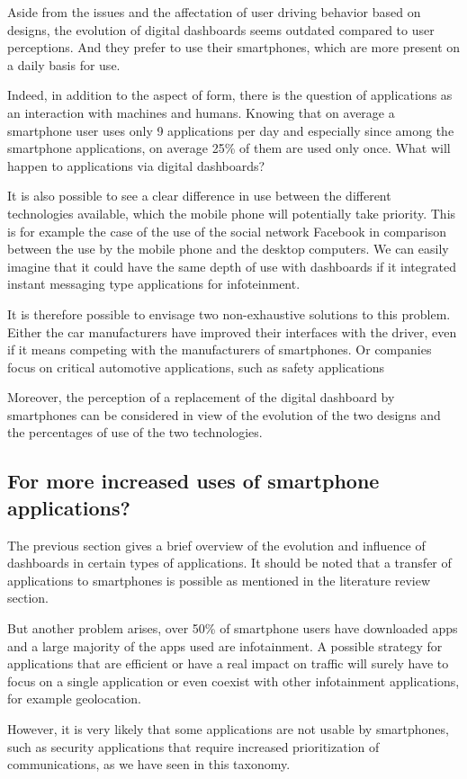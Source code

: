 Aside from the issues and the affectation of user driving behavior based on designs\cite{firby_its_2020}, the evolution of digital dashboards seems outdated compared to user perceptions. And they prefer to use their smartphones, which are more present on a daily basis for use.

Indeed, in addition to the aspect of form, there is the question of applications as an interaction with machines and humans. Knowing that on average a smartphone user uses only 9 applications per day\cite{web_55_2019} and especially since among the smartphone applications, on average 25\% of them are used only once\cite{noauthor__nodate}. What will happen to applications via digital dashboards?

It is also possible to see a clear difference in use between the different technologies available, which the mobile phone will potentially take priority. This is for example the case of the use of the social network Facebook in comparison between the use by the mobile phone and the desktop computers\cite{noauthor_facebook_nodate}. We can easily imagine that it could have the same depth of use with dashboards if it integrated instant messaging type applications for infoteinment.

It is therefore possible to envisage two non-exhaustive solutions to this problem. Either the car manufacturers have improved their interfaces with the driver, even if it means competing with the manufacturers of smartphones. Or companies focus on critical automotive applications, such as safety applications

Moreover, the perception of a replacement of the digital dashboard by smartphones can be considered in view of the evolution of the two designs and the percentages of use of the two technologies.\cite{abdel-aty_using_nodate}

\subsection{For more increased uses of smartphone applications?}

The previous section gives a brief overview of the evolution and influence of dashboards in certain types of applications. It should be noted that a transfer of applications to smartphones is possible as mentioned in the literature review section.

But another problem arises, over 50\% of smartphone users have downloaded apps\cite{statista_research_department_monthly_2021} and a large majority of the apps used are infotainment\cite{statista_research_department_mobile_2021}. A possible strategy for applications that are efficient or have a real impact on traffic will surely have to focus on a single application or even coexist with other infotainment applications, for example geolocation.

However, it is very likely that some applications are not usable by smartphones, such as security applications that require increased prioritization of communications, as we have seen in this taxonomy.




